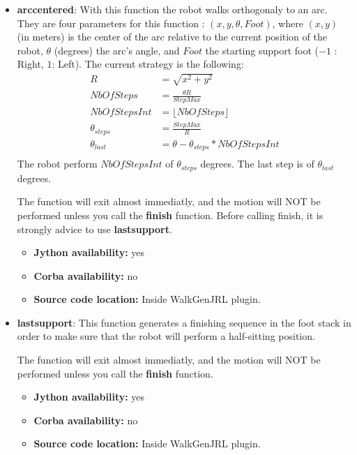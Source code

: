 \begin{itemize}
\item {\bf arccentered}: With this function the robot walks orthogonaly to
an arc. They are four parameters for this function : $(x,y,\theta,Foot)$,
where $(x,y)$ (in meters) is the center of the arc relative to the current position of the robot,
$\theta$ (degrees) the arc's angle, and $Foot$ the starting support foot ($-1$ : Right, $1$: Left).
The current strategy is the following:
\begin{equation}
\begin{aligned}
R &= \sqrt{x^2+y^2} \\
NbOfSteps &= \frac{\theta R }{StepMax} \\
NbOfStepsInt &= \lfloor NbOfSteps \rfloor \\
\theta_{steps} &= \frac{StepMax}{R} \\
\theta_{last} &= \theta - \theta_{steps} * NbOfStepsInt \\
\end{aligned}
\end{equation}
The robot perform $NbOfStepsInt$ of $\theta_{steps}$ degrees.
The last step is of $\theta_{last}$ degrees.
\par
The function will exit almost immediatly, and the motion will NOT
be performed unless you call the {\bf finish} function.
Before calling finish, it is strongly advice to use {\bf lastsupport}.

\begin{itemize}
\item \textbf{Jython availability:} yes
\item \textbf{Corba availability:} no
\item \textbf{Source code location:} Inside WalkGenJRL plugin.
\end{itemize}

\item {\bf lastsupport}: This function generates a finishing sequence in the foot stack in order to make sure
 that the robot will perform a half-sitting position.
\par
The function will exit almost immediatly, and the motion will NOT
be performed unless you call the {\bf finish} function.

\begin{itemize}
\item \textbf{Jython availability:} yes
\item \textbf{Corba availability:} no
\item \textbf{Source code location:} Inside WalkGenJRL plugin.
\end{itemize}


\end{itemize}
